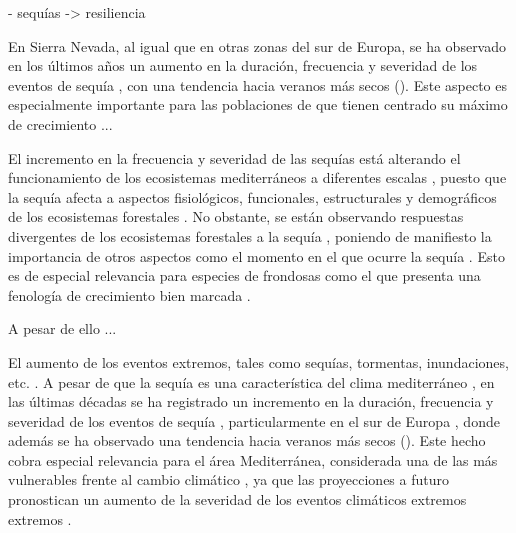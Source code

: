 - sequías -> resiliencia 

En Sierra Nevada, al igual que en otras zonas del sur de Europa, se ha observado en los últimos años un aumento en la duración, frecuencia y severidad de los eventos de sequía \autocites[ver capítulo \ref{sec:dendro} y apéndice \ref{sec:appendix:dendro};][]{VicenteSerranoetal2014EvidenceIncreasing,Staggeetal2017ObservedDrought,Spinonietal2015EuropeanDrought,Pascoaetal2017DroughtTrends}, con una tendencia hacia veranos más secos \autocites{Spinonietal2017PanEuropeanSeasonal} (). Este aspecto es especialmente importante para las poblaciones de \Qp que tienen centrado su máximo de crecimiento ... 

El incremento en la frecuencia y severidad de las sequías está alterando el funcionamiento de los ecosistemas mediterráneos a diferentes escalas \autocites{Penuelasetal2017ImpactsGlobal,Forneretal2018ExtremeDroughts,Liuetal2020EffectsDecadal,OgayaPenuelas2021ClimateChange}, puesto que la sequía afecta a aspectos fisiológicos, funcionales, estructurales y demográficos de los ecosistemas forestales \autocites{Allenetal2010GlobalOverview, Assaletal2016SpatialTemporal}. No obstante, se están observando respuestas divergentes de los ecosistemas forestales a la sequía \autocites{Andereggetal2020DivergentForest}, poniendo de manifiesto la importancia de otros aspectos como el momento en el que ocurre la sequía \autocites{Huangetal2018DroughtTiming}. Esto es de especial relevancia para especies de frondosas como el \Qpy que presenta una fenología de crecimiento bien marcada \autocites{PerezdeLisetal2016ChangesSpring}. 

A pesar de ello ... 


El aumento de los eventos extremos, tales como sequías, tormentas, inundaciones, etc. \autocite{IPCC2013ClimateChange}. A pesar de que la sequía es una característica del clima mediterráneo \autocites{Lionello2012}, en las últimas décadas se ha registrado un incremento en la duración, frecuencia y severidad de los eventos de sequía \autocites{LloydHughesSaunders2002DroughtClimatology, Sousaetal2011TrendsExtremes,Colletal2017DroughtVariability}, particularmente en el sur de Europa \autocites{VicenteSerranoetal2014EvidenceIncreasing,Staggeetal2017ObservedDrought,Spinonietal2015EuropeanDrought,Pascoaetal2017DroughtTrends}, donde además se ha observado una tendencia hacia veranos más secos \autocites{Spinonietal2017PanEuropeanSeasonal} (). Este hecho cobra especial relevancia para el área Mediterránea, considerada una de las más vulnerables frente al cambio climático \autocites{Giorgi2006ClimateChange}, ya que las proyecciones a futuro pronostican un aumento de la severidad de los eventos climáticos extremos extremos \autocites{Hoerlingetal2012IncreasedFrequency,IPCC2013ClimateChange,Trenberthetal2014GlobalWarming,Spinonietal2018WillDrought}.  

